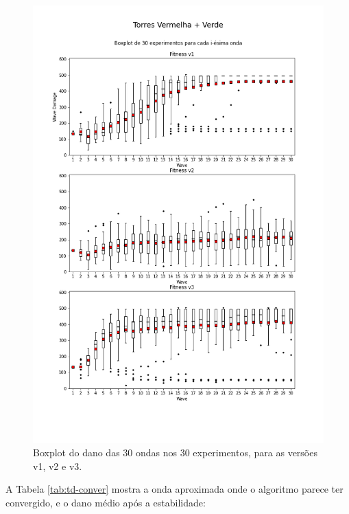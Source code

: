 \begin{figure}[H]
  \centering
  \includegraphics[width=1.1\textwidth]{figuras/td/boxplot Torres Vermelha + Verde.png}
  \caption{Boxplot do dano das 30 ondas nos 30 experimentos, para as versões v1, v2 e v3.}
  \label{td-box-rg}
\end{figure}

A Tabela \ref{tab:td-conver} mostra a onda aproximada onde o algoritmo parece ter convergido, e o dano médio após a estabilidade:

